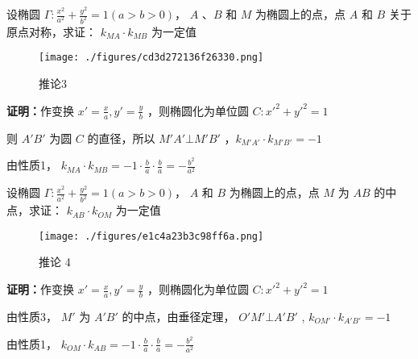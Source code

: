 \begin{corollary}{}
设椭圆 $\displaystyle{\Gamma:\frac{x^2}{a^2}+\frac{y^2}{b^2}=1(a>b>0)}$， $\displaystyle{A}$ 、$\displaystyle{B}$ 和 $\displaystyle{M}$ 为椭圆上的点，点 $\displaystyle{A}$ 和 $\displaystyle{B}$ 关于原点对称，求证： $\displaystyle{k_{MA}\cdot k_{MB}}$ 为一定值

\begin{figure}[ht]
\centering
\texttt{[image: ./figures/cd3d272136f26330.png]}
\caption{推论3} \label{fig_affine_2}
\end{figure}

\textbf{证明：}作变换 $\displaystyle{x'=\frac{x}{a},y'=\frac{y}{b}}$ ，则椭圆化为单位圆 $\displaystyle{C:x'^2+y'^2=1}$

则 $\displaystyle{A'B'}$ 为圆 $\displaystyle{C}$ 的直径，所以 $\displaystyle{M'A'\bot M'B'}$ ，$\displaystyle{k_{M'A'}\cdot k_{M'B'}=-1}$

由性质1， $\displaystyle{k_{MA}\cdot k_{MB}=-1\cdot \frac{b}{a}\cdot \frac{b}{a}=-\frac{b^2}{a^2}}$

\end{corollary}

\begin{corollary}{}
设椭圆 $\displaystyle{\Gamma:\frac{x^2}{a^2}+\frac{y^2}{b^2}=1(a>b>0)}$， $\displaystyle{A}$ 和 $\displaystyle{B}$ 为椭圆上的点，点 $\displaystyle{M}$ 为 $\displaystyle{AB}$ 的中点，求证： $\displaystyle{k_{AB}\cdot k_{OM}}$ 为一定值

\begin{figure}[ht]
\centering
\texttt{[image: ./figures/e1c4a23b3c98ff6a.png]}
\caption{推论 4} \label{fig_affine_3}
\end{figure}

\textbf{证明：}作变换 $\displaystyle{x'=\frac{x}{a},y'=\frac{y}{b}}$ ，则椭圆化为单位圆 $\displaystyle{C:x'^2+y'^2=1}$

由性质3， $\displaystyle{M'}$ 为 $\displaystyle{A'B'}$ 的中点，由垂径定理， $\displaystyle{O'M'\bot A'B'}$ , $\displaystyle{k_{OM'}\cdot k_{A'B'}=-1}$

由性质1， $\displaystyle{k_{OM}\cdot k_{AB}=-1\cdot \frac{b}{a}\cdot \frac{b}{a}=-\frac{b^2}{a^2}}$

\end{corollary} 

